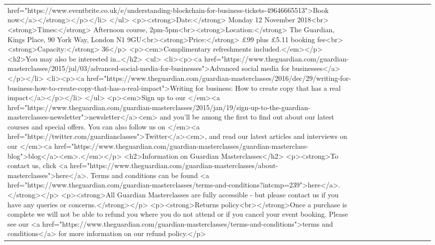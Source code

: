 \documentclass[]{article}
\begin{document}
\begin{table}[!h]
\begin{tabular}[t]{llllllllllll}
href="https://www.eventbrite.co.uk/e/understanding-blockchain-for-business-tickets-49646665513">Book now</a></strong></p></li> </ul> <p><strong>Date:</strong> Monday 12 November 2018<br><strong>Times:</strong> Afternoon course, 2pm-5pm<br><strong>Location:</strong> The Guardian, Kings Place, 90 York Way, London N1 9GU<br><strong>Price:</strong> £99 plus £5.11 booking fee<br><strong>Capacity:</strong> 36</p> <p><em>Complimentary refreshments included.</em></p> <h2>You may also be interested in…</h2> <ul> <li><p><a href="https://www.theguardian.com/guardian-masterclasses/2015/jul/03/advanced-social-media-for-businesses">Advanced social media for businesses</a></p></li> <li><p><a href="https://www.theguardian.com/guardian-masterclasses/2016/dec/29/writing-for-business-how-to-create-copy-that-has-a-real-impact">Writing for business: How to create copy that has a real impact</a></p></li> </ul> <p><em>Sign up to our </em><a href="https://www.theguardian.com/guardian-masterclasses/2015/jan/19/sign-up-to-the-guardian-masterclasses-newsletter">newsletter</a><em> and you’ll be among the first to find out about our latest courses and special offers. You can also follow us on </em><a href="https://twitter.com/guardianclasses">Twitter</a><em>, and read our latest articles and interviews on our </em><a href="https://www.theguardian.com/guardian-masterclasses/guardian-masterclass-blog">blog</a><em>.</em></p> <h2>Information on Guardian Masterclasses</h2> <p><strong>To contact us, click <a href="https://www.theguardian.com/guardian-masterclasses/about-masterclasses">here</a>. Terms and conditions can be found <a href="https://www.theguardian.com/guardian-masterclasses/terms-and-conditions?intcmp=239">here</a>.</strong></p> <p><strong>All Guardian Masterclasses are fully accessible - but please contact us if you have any queries or concerns.</strong></p> <p><strong>Returns policy<br></strong>Once a purchase is complete we will not be able to refund you where you do not attend or if you cancel your event booking. Please see our <a href="https://www.theguardian.com/guardian-masterclasses/terms-and-conditions">terms and conditions</a> for more information on our refund policy.</p>\\

\end{tabular}
\end{table}
\end{document}
